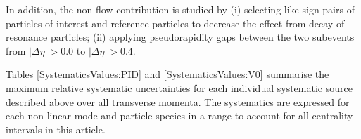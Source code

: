 In addition, the non-flow contribution is studied by (i) selecting like sign pairs of particles of interest and reference particles to decrease the effect from decay of resonance particles; (ii) applying pseudorapidity gaps between the two subevents from $|\Delta\eta|>0.0$ to $|\Delta\eta|>0.4$.


Tables \ref{SystematicsValues:PID} and \ref{SystematicsValues:V0} summarise the maximum relative systematic uncertainties for each individual systematic source described above over all transverse momenta. The systematics are expressed for each non-linear mode and particle species in a range to account for all centrality intervals in this article. 







